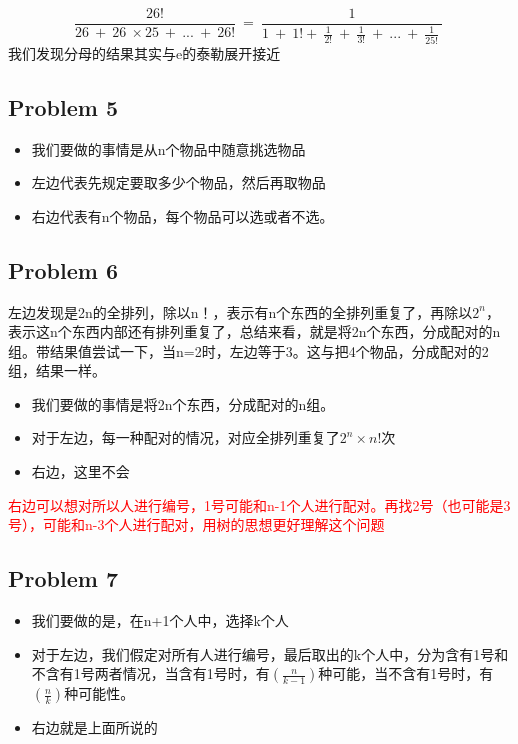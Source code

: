 \documentclass{article}
\begin{document}
$$
\frac{26!}{26\  +\  26\  \times 25\  +\  ...\  +\  26!} \  =\  \frac{1}{1\  +\  1!+\  \frac{1}{2!} \  +\  \frac{1}{3!} \  +\  ...\  +\  \frac{1}{25!} \  } \  
$$
我们发现分母的结果其实与e的泰勒展开接近


\clearpage
\subsection*{Problem 5}

\begin{itemize}
\item 我们要做的事情是从n个物品中随意挑选物品
\item 左边代表先规定要取多少个物品，然后再取物品
\item 右边代表有n个物品，每个物品可以选或者不选。
\end{itemize}

\clearpage

\subsection*{Problem 6}
左边发现是2n的全排列，除以n！，表示有n个东西的全排列重复了，再除以$2^{n}$，表示这n个东西内部还有排列重复了，总结来看，就是将2n个东西，分成配对的n组。带结果值尝试一下，当n=2时，左边等于3。这与把4个物品，分成配对的2组，结果一样。
\begin{itemize}


\item 我们要做的事情是将2n个东西，分成配对的n组。
\item 对于左边，每一种配对的情况，对应全排列重复了$2^{n}\times n!$次
\item 右边，这里不会
\end{itemize}

\textcolor{red}{右边可以想对所以人进行编号，1号可能和n-1个人进行配对。再找2号（也可能是3号），可能和n-3个人进行配对，用树的思想更好理解这个问题}

\clearpage
\subsection*{Problem 7}

\begin{itemize}
\item 我们要做的是，在n+1个人中，选择k个人
\item 对于左边，我们假定对所有人进行编号，最后取出的k个人中，分为含有1号和不含有1号两者情况，当含有1号时，有$\left( \frac{n}{k-1} \right) $种可能，当不含有1号时，有$\left( \frac{n}{k} \right) $种可能性。
\item 右边就是上面所说的
\end{itemize}
\end{document}
